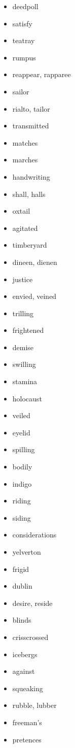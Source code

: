\documentclass{article}
\begin{document}
\begin{itemize}
    \item deedpoll
    \item satisfy
    \item teatray
    \item rumpus
    \item reappear, rapparee
    \item sailor
    \item rialto, tailor
    \item transmitted
    \item matches
    \item marches
    \item handwriting
    \item shall, halls
    \item oxtail
    \item agitated
    \item timberyard
    \item dineen, dienen
    \item justice
    \item envied, veined
    \item trilling
    \item frightened
    \item demise
    \item swilling
    \item stamina
    \item holocaust
    \item veiled
    \item eyelid
    \item spilling
    \item bodily
    \item indigo
    \item riding
    \item siding
    \item considerations
    \item yelverton
    \item frigid
    \item dublin
    \item desire, reside
    \item blinds
    \item crisscrossed
    \item icebergs
    \item against
    \item squeaking
    \item rubble, lubber
    \item freeman's
    \item pretences

\end{itemize}
\end{document}

